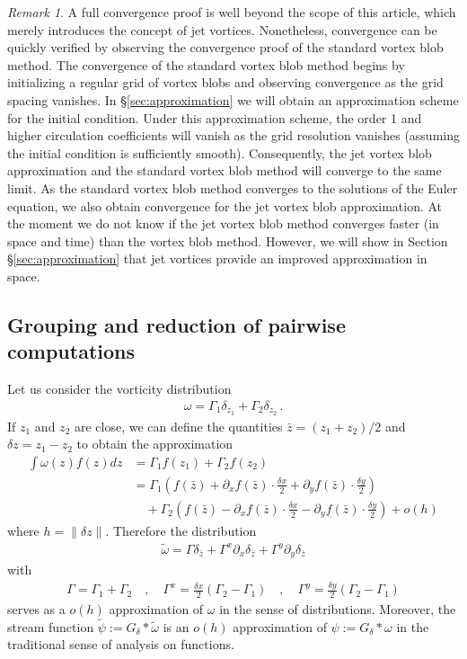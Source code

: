 \documentclass[12pt]{amsart}
\theoremstyle{remark}
\newtheorem{rmk}[thm]{Remark}
\begin{document}
\begin{rmk}
A full convergence proof is well beyond the scope of this article,
which merely introduces the concept of jet vortices.
Nonetheless, convergence can be quickly verified by observing the convergence proof of the standard vortex blob method.
The convergence of the standard vortex blob method begins by initializing a regular grid of vortex blobs
and observing convergence as the grid spacing vanishes.
In \S \ref{sec:approximation} we will obtain an approximation scheme for the initial condition.
Under this approximation scheme, the order 1 and higher circulation coefficients will vanish as the 
grid resolution vanishes (assuming the initial condition is sufficiently smooth).
Consequently, the jet vortex blob approximation and the standard vortex blob method will converge to the same limit.
As the standard vortex blob method converges to the solutions of the Euler equation, we also obtain convergence for the jet vortex blob approximation.
At the moment we do not know if the jet vortex blob method converges faster (in space and time) than the vortex blob method.
However, we will show in Section \S \ref{sec:approximation} that jet vortices provide an improved approximation in space.
\end{rmk}

\subsection{Grouping and reduction of pairwise computations}
\label{sec:grouping}

Let us consider the vorticity distribution
\begin{align*}
	\omega = \Gamma_1 \delta_{z_1} + \Gamma_2 \delta_{z_2}\,.
\end{align*}
If $z_1$ and $z_2$ are close, we can define the quantities $\bar{z} = (z_1+z_2)/2$ and $\delta z = z_1 - z_2 $ to obtain the approximation
\begin{align*}
	\int \omega(z) f(z)dz &= \Gamma_1 f(z_1) + \Gamma_2 f(z_2) \\
		&= \Gamma_1 \left( f(\bar{z}) + \partial_x f(\bar{z}) \cdot \frac{\delta x}{2} + \partial_y f(\bar{z}) \cdot \frac{\delta y}{2}  \right)\\
		&\quad + \Gamma_2 \left( f(\bar{z}) - \partial_x f(\bar{z}) \cdot \frac{\delta x}{2} - \partial_y f(\bar{z}) \cdot \frac{\delta y}{2}  \right) + o( h ) 
\end{align*}
where $h = \| \delta z \|$.
Therefore the distribution
\begin{align*}
	\tilde{\omega} = \Gamma \delta_{\bar{z}} + \Gamma^x \partial_x \delta_{\bar{z}} + \Gamma^y \partial_y \delta_{\bar{z}}
\end{align*}
with 
\begin{align*}
	\Gamma = \Gamma_1 + \Gamma_2 \quad,\quad \Gamma^x = \frac{\delta x}{2} (\Gamma_2 -\Gamma_1) \quad,\quad \Gamma^y = \frac{\delta y}{2} (\Gamma_2 -\Gamma_1)
\end{align*}
serves as a $o(h)$ approximation of $\omega$ in the sense of distributions.
Moreover, the stream function $\tilde{\psi} := G_\delta * \tilde{\omega}$ is an $o(h)$ approximation of $\psi := G_\delta * \omega$ in the traditional sense of analysis on functions.
\end{document}
